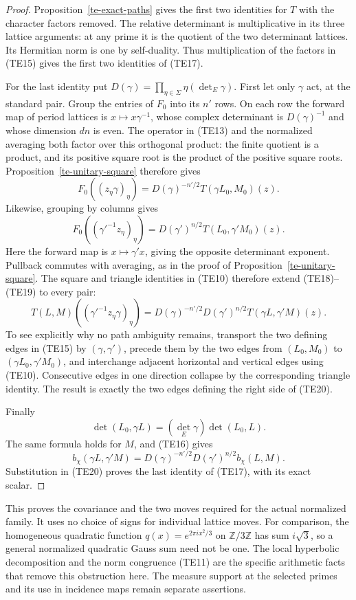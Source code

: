 \begin{proof}
Proposition~\ref{te-exact-paths} gives the first two
identities for $T$ with the character factors removed.
The relative determinant is multiplicative in its
three lattice arguments: at any prime it is the
quotient of the two determinant lattices.  Its
Hermitian norm is one by self-duality.
Thus multiplication of the factors in (TE15) gives
the first two identities of (TE17).

For the last identity put
$D(\gamma)=\prod_{\eta\in\Sigma}\eta(\det_E\gamma)$.
First let only $\gamma$ act, at the standard pair.
Group the entries of $F_0$ into its $n'$ rows.
On each row the forward map of period lattices is
$x\mapsto x\gamma^{-1}$, whose complex determinant
is $D(\gamma)^{-1}$ and whose dimension $dn$ is even.
The operator in (TE13) and the normalized averaging
both factor over this orthogonal product: the finite
quotient is a product, and its positive square root
is the product of the positive square roots.
Proposition~\ref{te-unitary-square} therefore gives
\[
 F_0((z_\eta\gamma)_\eta)
                   =D(\gamma)^{-n'/2}T(\gamma L_0,M_0)(z).
 \tag{TE18}
\]
Likewise, grouping by columns gives
\[
 F_0((\gamma'^{-1}z_\eta)_\eta)
                    =D(\gamma')^{n/2}T(L_0,\gamma'M_0)(z).
 \tag{TE19}
\]
Here the forward map is $x\mapsto\gamma'x$, giving
the opposite determinant exponent.
Pullback commutes with averaging, as in the proof of
Proposition~\ref{te-unitary-square}.
The square and triangle identities in (TE10) therefore
extend (TE18)--(TE19) to every pair:
\[
 T(L,M)((\gamma'^{-1}z_\eta\gamma)_\eta)
       =D(\gamma)^{-n'/2}D(\gamma')^{n/2}
                                      T(\gamma L,\gamma'M)(z).
 \tag{TE20}
\]
To see explicitly why no path ambiguity remains,
transport the two defining edges in (TE15) by
$(\gamma,\gamma')$, precede them by the two edges
from $(L_0,M_0)$ to $(\gamma L_0,\gamma'M_0)$, and
interchange adjacent horizontal and vertical edges
using (TE10).  Consecutive edges in one direction
collapse by the corresponding triangle identity.
The result is exactly the two edges defining the
right side of (TE20).

Finally
\[
 \det(L_0,\gamma L)=(\det_E\gamma)\det(L_0,L).
\]
The same formula holds for $M$, and (TE16) gives
\[
 b_\chi(\gamma L,\gamma'M)
            =D(\gamma)^{-n'/2}D(\gamma')^{n/2}b_\chi(L,M).
\]
Substitution in (TE20) proves the last identity of
(TE17), with its exact scalar.
\end{proof}

This proves the covariance and the two moves required
for the actual normalized family.  It uses no choice
of signs for individual lattice moves.  For comparison,
the homogeneous quadratic function
$q(x)=e^{2\pi ix^2/3}$ on $\mathbb Z/3\mathbb Z$ has
sum $i\sqrt3$, so a general normalized quadratic Gauss
sum need not be one.  The local hyperbolic decomposition
and the norm congruence (TE11) are the specific arithmetic
facts that remove this obstruction here.  The measure
support at the selected primes and its use in incidence
maps remain separate assertions.


